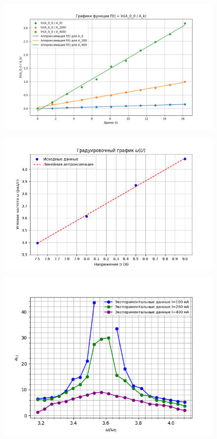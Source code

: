 \documentclass[a4paper]{article}
\begin{document}
\begin{figure}[H]
\begin{center}
\includegraphics[scale=0.5]{gra_1.png}
\end{center}
\end{figure}
\begin{figure}[H]
\begin{center}
\includegraphics[scale=0.5]{gra_3.png}
\end{center}
\end{figure}



\begin{figure}[H]
\begin{center}
\includegraphics[scale=0.5]{gra_4.png}
\end{center}
\end{figure}
\end{document}
